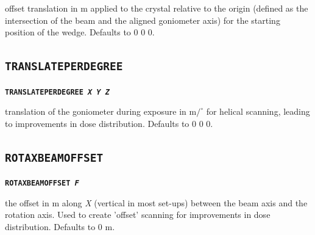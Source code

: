 \documentclass[a4paper]{article}
\newcommand{\Keyword}[1]{\texttt{\textbf{#1}}\xspace}
\begin{document}
offset translation in \hbox{\textmu}m applied to the crystal relative to the origin (defined as the intersection of the beam and the aligned goniometer axis) for the starting position of the wedge. Defaults to 0 0 0.



\subsection{\Keyword{TRANSLATEPERDEGREE}}

\noindent \Keyword{TRANSLATEPERDEGREE \textit{X Y Z}}

translation of the goniometer during exposure in \hbox{\textmu}m$/^{\circ}$ for helical scanning, leading to improvements in dose distribution. Defaults to 0 0 0.



\subsection{\Keyword{ROTAXBEAMOFFSET}}

\noindent \Keyword{ROTAXBEAMOFFSET \textit{F}}

the offset in \hbox{\textmu}m along \textit{X} (vertical in most set-ups) between the beam axis and the rotation axis. Used to create 'offset' scanning for improvements in dose distribution. Defaults to 0 \hbox{\textmu}m.
\end{document}
